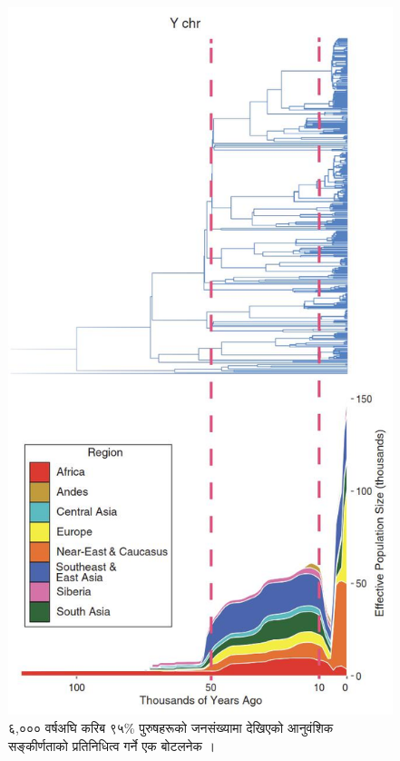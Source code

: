 \documentclass[10pt,twocolumn,letterpaper]{article}
\begin{document}
\begin{figure}[b]
\begin{center}
   \includegraphics[width=1\linewidth]{bottleneck.jpg}
\end{center}
   \caption{६,००० वर्षअघि करिब ९५\% पुरुषहरूको जनसंख्यामा देखिएको आनुवंशिक सङ्कीर्णताको प्रतिनिधित्व गर्ने एक बोटलनेक \cite{62}।}
\label{fig:10}
\label{fig:onecol}
\end{figure}
\end{document}
